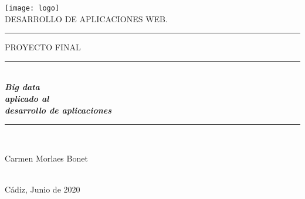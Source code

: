 \documentclass[12pt,a4paper,]{book}
\title{}
\author{}
\date{}
\numberwithin{dummy}{section}
\theoremstyle{ocrenumbox}
\theoremstyle{blacknumex}
\theoremstyle{blacknumbox}
\theoremstyle{ocrenum}
\theoremstyle{ocrenum}
\begin{document}
\begin{titlepage}

\newcommand{\HRule}{\rule{\linewidth}{0.5mm}} %

\center %


\begin{minipage}{14cm}
\center

\texttt{[image: logo]}\\[0.5cm] %


\textsc{\LARGE DESARROLLO DE APLICACIONES WEB.}\\[2.5cm] 



\rule[1.7mm]{2cm}{0.5mm}
\hfill
\textsc{\Large PROYECTO FINAL} 
\hfill
\rule[1.7mm]{2cm}{0.5mm} 
\\[0.75cm]

{\Huge
\textbf{\textit{
Big data \\[0.2cm]
aplicado al \\[0.5cm]
desarrollo de aplicaciones
}}}\\[0.75cm] 

\HRule \\[4cm]


{\Large

Carmen Morlaes Bonet} \\[0.5cm]

{\large
Cádiz, Junio de 2020
}

\end{minipage}

\vfill %

\cleardoublepage
\thispagestyle{empty}
\end{titlepage}
\end{document}
